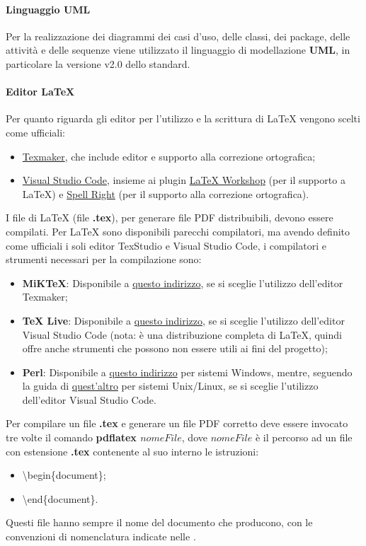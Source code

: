 \paragraph*{Linguaggio UML}
Per la realizzazione dei diagrammi dei casi d'uso, delle classi, dei package, delle attività e delle sequenze viene utilizzato il linguaggio di modellazione \textbf{UML}, in particolare la versione v2.0 dello standard.

\paragraph*{Editor \LaTeX}
Per quanto riguarda gli editor per l'utilizzo e la scrittura di \LaTeX{} vengono scelti come ufficiali:
\begin{itemize}
	\item \href{https://www.xm1math.net/texmaker/}{Texmaker}, che include editor e supporto alla correzione ortografica;
	\item \href{https://code.visualstudio.com/}{Visual Studio Code}, insieme ai plugin \href{https://github.com/James-Yu/LaTeX-Workshop}{LaTeX Workshop} (per il supporto a \LaTeX) e \href{https://github.com/bartosz-antosik/vscode-spellright}{Spell Right} (per il supporto alla correzione ortografica).
\end{itemize}
I file di \LaTeX{} (file \textbf{.tex}), per generare file PDF distribuibili, devono essere compilati.
Per \LaTeX{} sono disponibili parecchi compilatori, ma avendo definito come ufficiali i soli editor TexStudio e Visual Studio Code,
i compilatori e strumenti necessari per la compilazione sono:
\begin{itemize}
    \item \textbf{MiKTeX}: Disponibile a \href{https://miktex.org/}{questo indirizzo}, se si sceglie l'utilizzo dell'editor Texmaker;
    \item \textbf{TeX Live}: Disponibile a \href{https://www.tug.org/texlive/}{questo indirizzo}, se si sceglie l'utilizzo dell'editor Visual Studio Code (nota: è una distribuzione completa di \LaTeX, quindi offre anche strumenti che possono non essere utili ai fini del progetto);
    \item \textbf{Perl}: Disponibile a \href{http://strawberryperl.com/}{questo indirizzo} per sistemi Windows, mentre, seguendo la guida di \href{https://learn.perl.org/installing/unix_linux.html}{quest'altro} per sistemi Unix/Linux, se si sceglie l'utilizzo dell'editor Visual Studio Code.
\end{itemize}
Per compilare un file \textbf{.tex} e generare un file PDF corretto deve essere invocato tre volte il comando \textbf{pdflatex $nomeFile$}, dove $nomeFile$ è il percorso ad un file con estensione \textbf{.tex} contenente al suo interno le istruzioni:
\begin{itemize}
    \item \textbackslash begin\{document\};
    \item \textbackslash end\{document\}.
\end{itemize}
Questi file hanno sempre il nome del documento che producono, con le convenzioni di nomenclatura indicate nelle \NdP{}.

